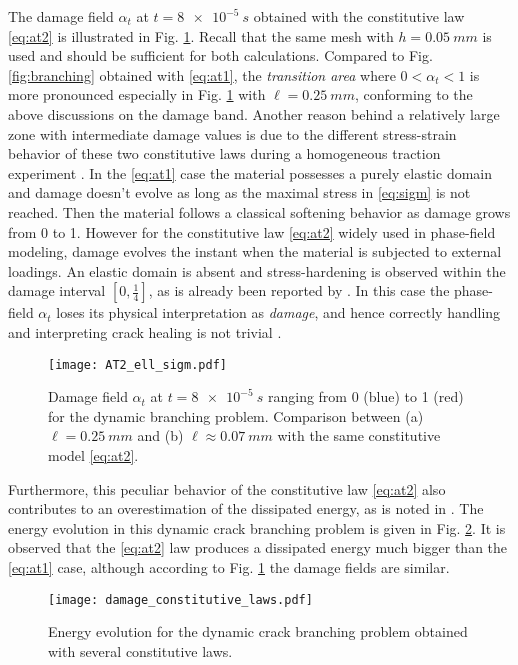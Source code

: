 The damage field $\alpha_t$ at $t=\SI{8e-5}{s}$ obtained with the constitutive law \eqref{eq:at2} is illustrated in Fig. \ref{fig:at2_ell_sigm}. Recall that the same mesh with $h=\SI{0.05}{mm}$ is used and should be sufficient for both calculations. Compared to Fig. \ref{fig:branching} obtained with \eqref{eq:at1}, the \emph{transition area} where $0<\alpha_t<1$ is more pronounced especially in Fig. \ref{fig:at2_ell_sigm} with $\ell=\SI{0.25}{mm}$, conforming to the above discussions on the damage band. Another reason behind a relatively large zone with intermediate damage values is due to the different stress-strain behavior of these two constitutive laws during a homogeneous traction experiment \cite{PhamAmorMarigoMaurini:2011}. In the \eqref{eq:at1} case the material possesses a purely elastic domain and damage doesn't evolve as long as the maximal stress in \eqref{eq:sigm} is not reached. Then the material follows a classical softening behavior as damage grows from 0 to 1. However for the constitutive law \eqref{eq:at2} widely used in phase-field modeling, damage evolves the instant when the material is subjected to external loadings. An elastic domain is absent and stress-hardening is observed within the damage interval $[0,\frac{1}{4}]$, as is already been reported by \cite{BordenVerhooselScottHughesLandis:2012,SchlueterWillenbuecherKuhnMueller:2014}. In this case the phase-field $\alpha_t$ loses its physical interpretation as \emph{damage}, and hence correctly handling and interpreting crack healing is not trivial \cite{SchlueterWillenbuecherKuhnMueller:2014}.
\begin{figure}[htbp]
\centering
\texttt{[image: AT2\_ell\_sigm.pdf]}
\caption{Damage field $\alpha_t$ at $t=\SI{8e-5}{s}$ ranging from 0 (blue) to 1 (red) for the dynamic branching problem. Comparison between (a) $\ell=\SI{0.25}{mm}$ and (b) $\ell\approx\SI{0.07}{mm}$ with the same constitutive model \eqref{eq:at2}.} \label{fig:at2_ell_sigm}
\end{figure}

Furthermore, this peculiar behavior of the constitutive law \eqref{eq:at2} also contributes to an overestimation of the dissipated energy, as is noted in \cite{BordenVerhooselScottHughesLandis:2012,VignolletMayBorstVerhoosel:2014}. The energy evolution in this dynamic crack branching problem is given in Fig. \ref{fig:energy_at1_at2}. It is observed that the \eqref{eq:at2} law produces a dissipated energy much bigger than the \eqref{eq:at1} case, although according to Fig. \ref{fig:at2_ell_sigm} the damage fields are similar.
\begin{figure}[htbp]
\centering
\texttt{[image: damage\_constitutive\_laws.pdf]}
\caption{Energy evolution for the dynamic crack branching problem obtained with several constitutive laws.} \label{fig:energy_at1_at2}
\end{figure}

